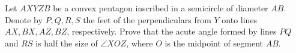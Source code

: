 Let $AXYZB$ be a convex pentagon inscribed in a semicircle of diameter $AB$. Denote by
$P,Q,R,S$ the feet of the perpendiculars from $Y$ onto lines $AX,BX,AZ,BZ$, respectively. Prove that the acute angle formed by lines $PQ$ and $RS$ is half the size of $\angle{XOZ}$, where $O$ is the midpoint of segment $AB$.